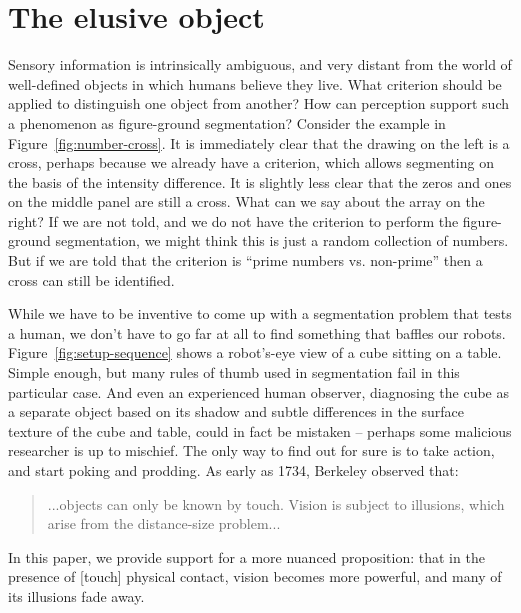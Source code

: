 \section{The elusive object}

\label{sect:introduction}

Sensory information is intrinsically ambiguous, and very distant from
the world of well-defined objects in which humans believe they live.  
What criterion should be applied to distinguish one object from
another?  How can perception support such a phenomenon as figure-ground
segmentation?  
Consider the example in Figure~\ref{fig:number-cross}.  It is
immediately clear that the drawing on the left is a cross, perhaps
because we already have a criterion, which allows segmenting on the
basis of the intensity difference. It is slightly less clear that the
zeros and ones on the middle panel are still a cross. What can we say
about the array on the right? If we are not told, and we do not have
the criterion to perform the figure-ground segmentation, we might
think this is just a random collection of numbers. But if we are told
that the criterion is ``prime numbers vs. non-prime'' then a cross can
still be identified.

While we have to be inventive to come up with a segmentation problem
that tests a human, we don't have to go far at all to find something
that baffles our robots.  Figure~\ref{fig:setup-sequence} shows a
robot's-eye view of a cube sitting on a table.  Simple enough, but
many rules of thumb used in segmentation fail in this particular case.
And even an experienced human observer, diagnosing the cube as a
separate object based on its shadow and subtle differences in the
surface texture of the cube and table, could in fact be mistaken --
perhaps some malicious researcher is up to mischief.  The only way to
find out for sure is to take action, and start poking and prodding.
As early as 1734, Berkeley observed that:
%
\begin{quote}
...objects can only be known by
touch. Vision is subject to illusions, which arise from the
distance-size problem... \cite{berkeley72new}
\end{quote}
%
In this paper, we provide support for a more nuanced proposition: that
in the presence of [touch] physical contact, vision becomes more powerful, and many of
its illusions fade away.


